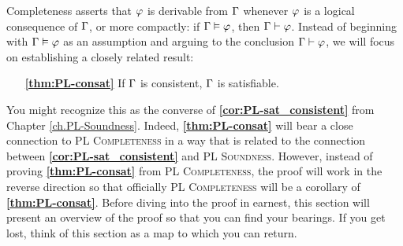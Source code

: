 

Completeness asserts that $\varphi$ is derivable from $\Gamma$ whenever $\varphi$ is a logical consequence of $\Gamma$, or more compactly: if $\Gamma\vDash\varphi$, then $\Gamma\vdash\varphi$.
Instead of beginning with $\Gamma\vDash\varphi$ as an assumption and arguing to the conclusion $\Gamma\vdash\varphi$, we will focus on establishing a closely related result: 
\begin{enumerate}[leftmargin=1.5in]
  \item[\textbf{\ref{thm:PL-consat}}] If $\Gamma$ is consistent, $\Gamma$ is satisfiable. 
\end{enumerate}
You might recognize this as the converse of \textbf{\ref{cor:PL-sat_consistent}} from Chapter \ref{ch.PL-Soundness}.
Indeed, \textbf{\ref{thm:PL-consat}} will bear a close connection to \textsc{PL Completeness} in a way that is related to the connection between \textbf{\ref{cor:PL-sat_consistent}} and \textsc{PL Soundness}.
However, instead of proving \textbf{\ref{thm:PL-consat}} from \textsc{PL Completeness}, the proof will work in the reverse direction so that officially \textsc{PL Completeness} will be a corollary of \textbf{\ref{thm:PL-consat}}.
Before diving into the proof in earnest, this section will present an overview of the proof so that you can find your bearings.
If you get lost, think of this section as a map to which you can return.

